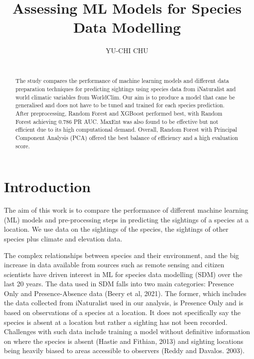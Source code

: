 \documentclass{article}
\title{Assessing ML Models for Species Data Modelling}
\author{
  YU-CHI CHU\\
\\
}
\begin{document}
\maketitle

\begin{abstract}

 The study compares the performance of machine learning models and different data preparation techniques for predicting sightings using species data from iNaturalist and world climatic variables from WorldClim. Our aim is to produce a model that cane be generalised and does not have to be tuned and trained for each species prediction.  After preprocessing, Random Forest and XGBoost performed best, with Random Forest achieving 0.786 PR AUC. MaxEnt was also found to be effective but not efficient due to its high computational demand. Overall, Random Forest with Principal Component Analysis (PCA) offered the best balance of efficiency and a high evaluation score.  
\end{abstract}




\section{Introduction}

The aim of this work is to compare the performance of different machine learning (ML) models and pre-processing steps in predicting the sightings of a species at a location.   We use data on the sightings of the species, the sightings of other species plus climate and elevation data.  

The complex relationships between species and their environment, and the big increase in data available from sources such as remote sensing and citizen scientists have driven interest in ML for species data modelling (SDM)\cite{sdm} over the last 20 years.  The data used in SDM falls into two main categories: Presence Only and Presence-Absence data\cite{sdm} (Beery et al, 2021).  The former, which includes the data collected from iNaturalist\cite{iNaturalist} used in our analysis, is Presence Only and is based on observations of a species at a location.  It does not specifically say the species is absent at a location but rather a sighting has not been recorded.   Challenges with such data include training a model without definitive information on where the species is absent\cite{presence_only} (Hastie and Fithian, 2013) and sighting locations being heavily biased to areas accessible to observers\cite{sampling-bias} (Reddy and Davalos. 2003). 
\end{document}
